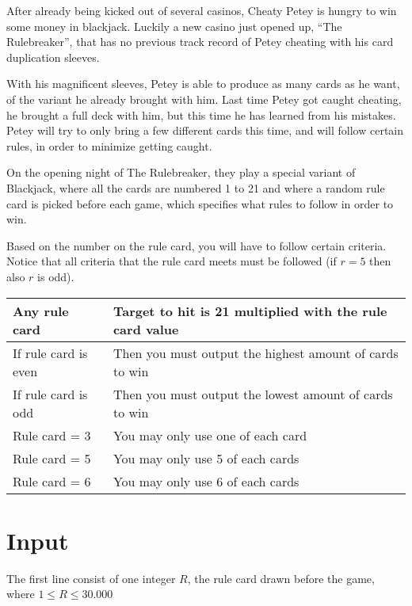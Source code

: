 
After already being kicked out of several casinos, Cheaty Petey is hungry to win some money in blackjack. Luckily a new casino just opened up, “The Rulebreaker”, that has no previous track record of Petey cheating with his card duplication sleeves.

With his magnificent sleeves, Petey is able to produce as many cards as he want, of the variant he already brought with him. Last time Petey got caught cheating, he brought a full deck with him, but this time he has learned from his mistakes. Petey will try to only bring a few different cards this time, and will follow certain rules, in order to minimize getting caught.

On the opening night of The Rulebreaker, they play a special variant of Blackjack, where all the cards are numbered 1 to 21 and where a random rule card is picked before each game, which specifies what rules to follow in order to win. 

Based on the number on the rule card, you will have to follow certain criteria. Notice that all criteria that the rule card meets must be followed (if $r = 5$ then also $r$ is odd). 


\begin{tabular}{|ll|}
\hline
\textbf{Any rule card} & \textbf{Target to hit is 21 multiplied with the rule card value} \\ \hline
If rule card is even & Then you must output the highest amount of cards to win \\ \hline
If rule card is odd   & Then you must output the lowest amount of cards to win  \\ \hline
Rule card = 3         & You may only use one of each card                       \\ \hline
Rule card = 5         & You may only use 5 of each cards                        \\ \hline
Rule card = 6         & You may only use 6 of each cards                        \\ \hline
\end{tabular}

\section*{Input}
The first line consist of one integer $R$, the rule card drawn before the game, where 
$1\leq R \leq 30.000$

